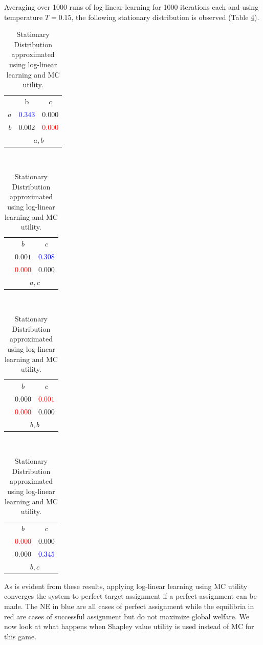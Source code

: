 \documentclass[defaultstyle,12pt]{proposal}
\begin{document}
Averaging over 1000 runs of log-linear learning for 1000 iterations each and using temperature $T = 0.15$, the following stationary distribution is observed (Table \ref{tab:mcsd}).

\begin{table}[!htb]
	\centering\begin{tabular}{r|c|c|}
	\multicolumn{1}{c}{}
	& \multicolumn{1}{c}{b}
	& \multicolumn{1}{c}{$c$}\\
	\cline{2-3}
	$a$ & \textcolor{blue}{$0.343$} & $0.000$\\
	\cline{2-3}
	$b$ & $0.002$ & \textcolor{red}{$0.000$}\\
	\cline{2-3}
	\multicolumn{1}{c}{}
	& \multicolumn{2}{c}{$a,b$}
	\end{tabular}~
	\centering\begin{tabular}{r|c|c|}
	\multicolumn{1}{c}{}
	& \multicolumn{1}{c}{$b$}
	& \multicolumn{1}{c}{$c$}\\
	\cline{2-3}
	& $0.001$ & \textcolor{blue}{$0.308$}\\
	\cline{2-3}
	& \textcolor{red}{$0.000$} & $0.000$\\
	\cline{2-3}
	\multicolumn{1}{c}{}
	& \multicolumn{2}{c}{$a,c$}
	\end{tabular}~
	\centering\begin{tabular}{r|c|c|}
	\multicolumn{1}{c}{}
	& \multicolumn{1}{c}{$b$}
	& \multicolumn{1}{c}{$c$}\\
	\cline{2-3}
	& $0.000$ & \textcolor{red}{$0.001$}\\
	\cline{2-3}
	& \textcolor{red}{$0.000$} & $0.000$\\
	\cline{2-3}
	\multicolumn{1}{c}{}
	& \multicolumn{2}{c}{$b,b$}
	\end{tabular}~
	\centering\begin{tabular}{r|c|c|}
	\multicolumn{1}{c}{}
	& \multicolumn{1}{c}{$b$}
	& \multicolumn{1}{c}{$c$}\\
	\cline{2-3}
	& \textcolor{red}{$0.000$} & $0.000$\\
	\cline{2-3}
	& $0.000$ & \textcolor{blue}{$0.345$}\\
	\cline{2-3}
	\multicolumn{1}{c}{}
	& \multicolumn{2}{c}{$b,c$}
	\end{tabular}
	\centering\caption{Stationary Distribution approximated using log-linear learning and MC utility.}\label{tab:mcsd}
\end{table}

As is evident from these results, applying log-linear learning using MC utility converges the system to perfect target assignment if a perfect assignment can be made. The NE in blue are all cases of perfect assignment while the equilibria in red are cases of successful assignment but do not maximize global welfare. We now look at what happens when Shapley value utility is used instead of MC for this game.
\end{document}
